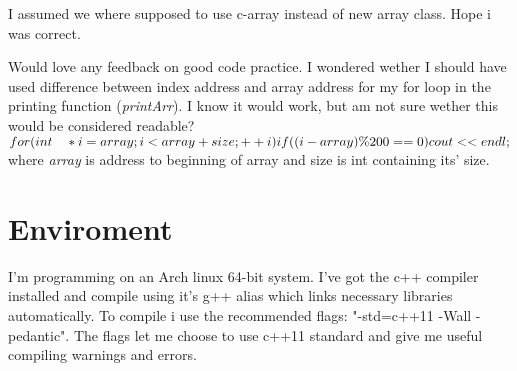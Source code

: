 \documentclass[11pt]{article}
\begin{document}
I assumed we where supposed to use c-array instead of new array class. Hope i was correct. 

Would love any feedback on good code practice. 
I wondered wether I should have used difference between index address and array address for my for loop in the printing function (\emph{printArr}). I know it would work, but am not sure wether this would be considered readable?
\newline \\
$for(int\quad*i=array;i<array+size;++i) \\
if((i-array)\%200==0) \\
cout << endl;
$
\newline \\
where \emph{array} is address to beginning of array and size is int containing its' size.
\section{Enviroment}
I'm programming on an Arch linux 64-bit system. I've got the c++ compiler installed and compile using it's g++ alias which links necessary libraries automatically. To compile i use the recommended flags: "-std=c++11 -Wall -pedantic". The flags let me choose to use c++11 standard and give me useful compiling warnings and errors. 
\flushright{\today}
\end{document}
